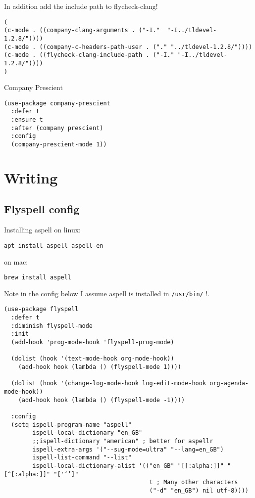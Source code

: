 \documentclass[12pt]{article}
\begin{document}
In addition add the include path to flycheck-clang!

\begin{verbatim}
(
(c-mode . ((company-clang-arguments . ("-I."  "-I../tldevel-1.2.8/"))))
(c-mode . ((company-c-headers-path-user . ("." "../tldevel-1.2.8/"))))
(c-mode . ((flycheck-clang-include-path . ("-I." "-I../tldevel-1.2.8/"))))
)

\end{verbatim}
Company Prescient
\begin{verbatim}
(use-package company-prescient
  :defer t
  :ensure t
  :after (company prescient)
  :config
  (company-prescient-mode 1))

\end{verbatim}

\section{Writing}
\label{sec:org5395f2e}
\subsection{Flyspell config}
\label{sec:orgc07d6bc}

Installing aspell on linux:

\begin{verbatim}
apt install aspell aspell-en
\end{verbatim}

on mac:

\begin{verbatim}
brew install aspell
\end{verbatim}

Note in the config below I assume aspell is installed in \texttt{/usr/bin/} !.

\begin{verbatim}
(use-package flyspell
  :defer t
  :diminish flyspell-mode
  :init
  (add-hook 'prog-mode-hook 'flyspell-prog-mode)

  (dolist (hook '(text-mode-hook org-mode-hook))
    (add-hook hook (lambda () (flyspell-mode 1))))

  (dolist (hook '(change-log-mode-hook log-edit-mode-hook org-agenda-mode-hook))
    (add-hook hook (lambda () (flyspell-mode -1))))

  :config
  (setq ispell-program-name "aspell"
        ispell-local-dictionary "en_GB"
        ;;ispell-dictionary "american" ; better for aspellr
        ispell-extra-args '("--sug-mode=ultra" "--lang=en_GB")
        ispell-list-command "--list"
        ispell-local-dictionary-alist '(("en_GB" "[[:alpha:]]" "[^[:alpha:]]" "['‘’]"
                                         t ; Many other characters
                                         ("-d" "en_GB") nil utf-8))))

\end{verbatim}
\end{document}
